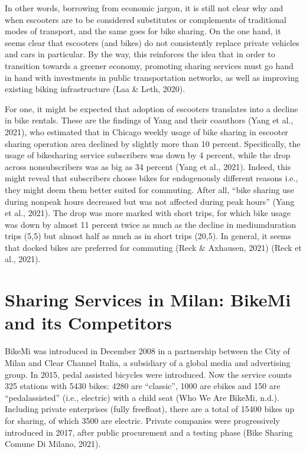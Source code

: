\documentclass[letterpaper,10pt,english]{jupyterBook}
\begin{document}
\sphinxAtStartPar
In other words, borrowing from economic jargon, it is still not clear why and when e\sphinxhyphen{}scooters are to be considered substitutes or complements of traditional modes of transport, and the same goes for bike sharing. On the one hand, it seems clear that e\sphinxhyphen{}scooters (and bikes) do not consistently replace private vehicles and cars in particular. By the way, this reinforces the idea that in order to transition towards a greener economy, promoting sharing services must go hand in hand with investments in public transportation networks, as well as improving existing biking infrastructure (Laa \& Leth, 2020).

\sphinxAtStartPar
For one, it might be expected that adoption of e\sphinxhyphen{}scooters translates into a decline in bike rentals. These are the findings of Yang and their coauthors (Yang et al., 2021), who estimated that in Chicago weekly usage of bike sharing in e\sphinxhyphen{}scooter sharing operation area declined by slightly more than 10 percent. Specifically, the usage of bike\sphinxhyphen{}sharing service subscribers was down by 4 percent, while the drop across non\sphinxhyphen{}subscribers was as big as 34 percent (Yang et al., 2021). Indeed, this might reveal that subscribers choose bikes for endogenously different reasons \sphinxhyphen{} i.e., they might deem them better suited for commuting. After all, “bike sharing use during non\sphinxhyphen{}peak hours decreased but was not affected during peak hours” (Yang et al., 2021). The drop was more marked with short trips, for which bike usage was down by almost 11 percent \sphinxhyphen{} twice as much as the decline in medium\sphinxhyphen{}duration trips (5,5) but almost half as much as in short trips (20,5). In general, it seems that docked bikes are preferred for commuting (Reck \& Axhausen, 2021) (Reck et al., 2021).


\section{Sharing Services in Milan: BikeMi and its Competitors}
\label{\detokenize{02-bikesharing_and_bikemi:sharing-services-in-milan-bikemi-and-its-competitors}}
\sphinxAtStartPar
BikeMi was introduced in December 2008 in a partnership between the City of Milan and Clear Channel Italia, a subsidiary of a global media and advertising group. In 2015, pedal assisted bicycles were introduced. Now the service counts 325 stations with 5430 bikes: 4280 are “classic”, 1000 are e\sphinxhyphen{}bikes and 150 are “pedal\sphinxhyphen{}assisted” (i.e., electric) with a child seat (Who We Are \sphinxhyphen{} BikeMi, n.d.). Including private enterprises (fully free\sphinxhyphen{}float), there are a total of 15400 bikes up for sharing, of which 3500 are electric. Private companies were progressively introduced in 2017, after public procurement and a testing phase (Bike Sharing \sphinxhyphen{} Comune Di Milano, 2021).
\end{document}
